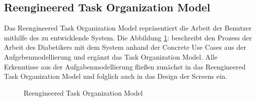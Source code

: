 \subsection{Reengineered Task Organization Model}
Das Reengineered Task Organization Model repräsentiert die Arbeit der Benutzer mithilfe des zu entwicklende System. Die Abbildung \ref{img:reengineeredTaskOrganizationModel}:  beschreibt den Prozess der Arbeit des Diabetikers mit dem System anhand der Concrete Use Cases aus der Aufgebenmodellierung und ergänzt das Task Organization Model. Alle Erkenntisse aus der Aufgabenmodellierung fließen zunächst in das Reengineered Task Organization Model und folglich auch in das Design der Screens ein.
\begin{figure}[H]
	\centering
	\setlength{\fboxsep}{1pt}
	\setlength{\fboxrule}{1pt}
	\captionsetup{justification=centering}
	\caption{Reengineered Task Organization Model}
	\label{img:reengineeredTaskOrganizationModel}
\end{figure}
